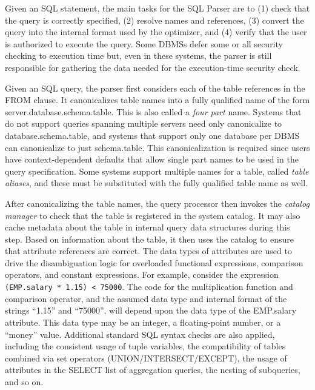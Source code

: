 \documentclass[b5paper,11pt,twoside,openright]{book}
\begin{document}
Given an SQL statement, the main tasks for the SQL Parser are to
  (1) check that the query is correctly specified, (2) resolve names and
  references, (3) convert the query into the internal format used by the
  optimizer, and (4) verify that the user is authorized to execute the
  query. Some DBMSs defer some or all security checking to execution
  time but, even in these systems, the parser is still responsible for
  gathering the data needed for the execution-time security check.

Given an SQL query, the parser first considers each of the table
references in the FROM clause. It canonicalizes table names into a fully
qualified name of the form server.database.schema.table. This is also
called a \emph{four part} name. Systems that do not support queries
spanning multiple servers need only canonicalize to
database.schema.table, and systems that support only one database per
DBMS can canonicalize to just schema.table. This canonicalization is
required since users have context-dependent defaults that allow single
part names to be used in the query specification. Some systems support
multiple names for a table, called \emph{table aliases}, and these must
be substituted with the fully qualified table name as well.

After canonicalizing the table names, the query processor then invokes
the \emph{catalog manager} to check that the table is registered in the
system catalog. It may also cache metadata about the table in internal
query data structures during this step. Based on information about the
table, it then uses the catalog to ensure that attribute references are
correct. The data types of attributes are used to drive the
disambiguation logic for overloaded functional expressions, comparison
operators, and constant expressions. For example, consider the
expression \texttt{(EMP.salary * 1.15) < 75000}. The code for the
multiplication function and comparison operator, and the assumed data
type and internal format of the strings ``1.15'' and ``75000'', will
depend upon the data type of the EMP.salary attribute. This data type
may be an integer, a floating-point number, or a ``money'' value.
Additional standard SQL syntax checks are also applied, including the
consistent usage of tuple variables, the compatibility of tables
combined via set operators (UNION/INTERSECT/EXCEPT), the usage of
attributes in the SELECT list of aggregation queries, the nesting of
subqueries, and so on.
\end{document}
